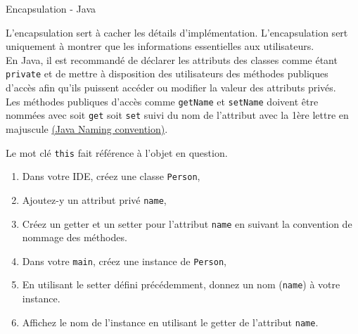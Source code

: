 \begin{Exercice}[10 minutes]{Encapsulation - Java}

L'encapsulation sert à cacher les détails d'implémentation. L'encapsulation sert uniquement à montrer que les informations essentielles aux utilisateurs.\\

En Java, il est recommandé de déclarer les attributs des classes comme étant \lstinline{private} et de mettre à disposition des utilisateurs des méthodes publiques d'accès afin qu'ils puissent accéder ou modifier la valeur des attributs privés.\\

Les méthodes publiques d'accès comme \lstinline{getName} et \lstinline{setName} doivent être nommées avec soit \lstinline{get} soit \lstinline{set} suivi du nom de l'attribut avec la 1ère lettre en majuscule \href{https://www.oracle.com/java/technologies/javase/codeconventions-namingconventions.html}{(Java Naming convention)}. 

Le mot clé \lstinline{this} fait référence à l'objet en question.\\

\begin{enumerate}
	\item Dans votre IDE, créez une classe \lstinline{Person},
	\item Ajoutez-y un attribut privé \lstinline{name},
	\item Créez un getter et un setter pour l'attribut \lstinline{name} en suivant la convention de nommage des méthodes.
	\item Dans votre \lstinline{main}, créez une instance de \lstinline{Person}, 
	\item En utilisant le setter défini précédemment, donnez un nom (\lstinline{name}) à votre instance.
	\item Affichez le nom de l'instance en utilisant le getter de l'attribut \lstinline{name}.
\end{enumerate}
	\begin{solution}  
		 
	\end{solution}
\end{Exercice}
	
